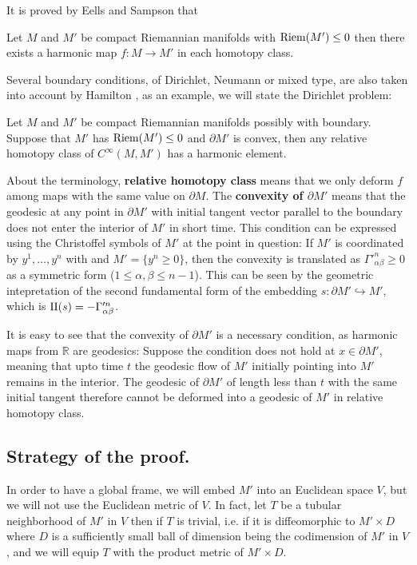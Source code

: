 It is proved by Eells and Sampson \cite{eells_harmonic_1964} that
\begin{theorem}
\label{thm:eells-sampson}
Let \(M\) and \(M'\) be compact Riemannian manifolds with \({\rm Riem } (M') \leq 0\) then there exists a harmonic map \(f: M \longrightarrow M'\) in each homotopy class.
\end{theorem}

Several boundary conditions, of Dirichlet, Neumann or mixed type, are also taken into account by Hamilton
\cite{hamilton_harmonic_1975}, as an example, we will state the Dirichlet problem:

\begin{theorem}[Hamilton]
\label{thm:hamilton-bndry-Dirichlet}
Let \(M\) and \(M'\) be compact Riemannian manifolds possibly with boundary. Suppose
that \(M'\) has \({\rm Riem } (M')\leq 0\) and \(\partial M'\) is convex, then any
relative homotopy class of \(C^\infty(M,M')\) has a harmonic element. 
\end{theorem}

About the terminology, \textbf{relative homotopy class} means that we only deform \(f\) among
maps with the same value on \(\partial M\). The \textbf{convexity of \(\partial M'\)} means
that the geodesic at any point in \(\partial M'\) with initial tangent vector parallel
to the boundary does not enter the interior of \(M'\) in short time. This condition can be expressed
using  the Christoffel symbols of \(M'\) at the point in question: If \(M'\) is
coordinated by \(y^1,\dots,y^n\) with and \(M' =\{y^n\geq 0\}\), then the convexity is
translated as \(\Gamma'^n_{\alpha\beta} \geq 0\) as a symmetric form (\(1\leq\alpha,\beta \leq n-1\)). This can be seen by the geometric intepretation of the second fundamental form of the
embedding \(s: \partial M' \hookrightarrow M'\), which is \(\sff(s) = -\Gamma'^n_{\alpha\beta}\).

It is easy to see that the convexity of \(\partial M'\) is a necessary condition, as
harmonic maps from \(\mathbb{R}\) are geodesics: Suppose the condition does not hold at
\(x\in \partial M'\), meaning that upto time \(t\) the geodesic flow of \(M'\)
initially pointing into
\(M'\) remains in the interior. The geodesic of \(\partial M'\) of length
less than \(t\) with the same initial tangent therefore cannot be deformed into a
geodesic of \(M'\) in relative homotopy class. 

\subsection{Strategy of the proof.}
\label{sec:orgc9815c3}
In order to have a global frame, we will embed \(M'\) into an Euclidean space \(V\),
but we will not use the Euclidean metric of \(V\). In fact, let \(T\) be a tubular
neighborhood of \(M'\) in \(V\) then if \(T\) is trivial, i.e. if it is diffeomorphic to \(M'\times D\)
where \(D\) is a sufficiently small ball of dimension being the codimension of \(M'\) in \(V\), and we will equip \(T\) with the product metric of \(M'\times D\). 

